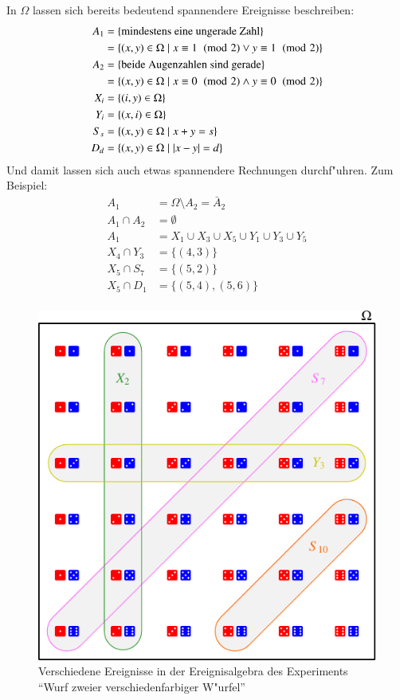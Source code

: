 In $\Omega$ lassen sich bereits bedeutend spannendere Ereignisse
beschreiben:
\begin{align*}
A_1&=\{\text{mindestens eine ungerade Zahl}\}\\
   &=\{(x,y)\in\Omega\;|\;x \equiv 1 \imod{2} \vee y\equiv 1 \imod{2}\}\\
A_2&=\{\text{beide Augenzahlen sind gerade}\}\\
   &=\{(x,y)\in\Omega\;|\;x \equiv 0 \imod{2} \wedge y \equiv 0 \imod{2}\}\\
X_i&=\{(i,y)\in\Omega\}\\
Y_i&=\{(x,i)\in\Omega\}\\
S_s&=\{(x,y)\in\Omega\;|\; x + y = s\}\\
D_d&=\{(x,y)\in\Omega\;|\; |x - y| = d\}\\
\end{align*}
Und damit lassen sich auch etwas spannendere Rechnungen durchf"uhren.
Zum Beispiel:
\begin{align*}
A_1&=\Omega \setminus A_2 = \bar A_2\\
A_1\cap A_2&=\emptyset\\
A_1&=X_1\cup X_3 \cup X_5\cup Y_1\cup Y_3\cup Y_5\\
X_4\cap Y_3&=\{(4,3)\}\\
X_5\cap S_7&=\{(5,2)\}\\
X_5\cap D_1&=\{(5,4), (5,6)\}\\
\end{align*}
\begin{figure}
\centering
\includegraphics{images/zweiwuerfel-1.pdf}
\caption{Verschiedene Ereignisse in der Ereignisalgebra des Experiments
``Wurf zweier verschiedenfarbiger W"urfel\label{zweiwuerfel}''}
\end{figure}

